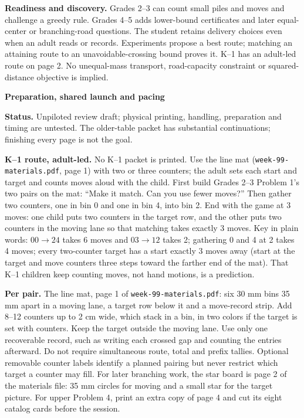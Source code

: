 \documentclass[11pt]{article}
\newcommand{\head}[1]{\par\textbf{\large #1}\par}
\begin{document}
\textbf{Readiness and discovery.} Grades 2--3 can count small piles and moves and challenge a greedy rule. Grades 4--5 adds lower-bound certificates and later equal-center or branching-road questions. The student retains delivery choices even when an adult reads or records. Experiments propose a best route; matching an attaining route to an unavoidable-crossing bound proves it. K--1 has an adult-led route on page 2. No unequal-mass transport, road-capacity constraint or squared-distance objective is implied.
\newpage
\head{Preparation, shared launch and pacing}
\textbf{Status.} Unpiloted review draft; physical printing, handling, preparation and timing are untested. The older-table packet has substantial continuations; finishing every page is not the goal.

\textbf{K--1 route, adult-led.} No K--1 packet is printed. Use the line mat (\texttt{week-99-materials.pdf}, page 1) with two or three counters; the adult sets each start and target and counts moves aloud with the child. First build Grades 2--3 Problem 1's two pairs on the mat: ``Make it match. Can you use fewer moves?'' Then gather two counters, one in bin 0 and one in bin 4, into bin 2. End with the game at 3 moves: one child puts two counters in the target row, and the other puts two counters in the moving lane so that matching takes exactly 3 moves. Key in plain words: $00\to24$ takes 6 moves and $03\to12$ takes 2; gathering 0 and 4 at 2 takes 4 moves; every two-counter target has a start exactly 3 moves away (start at the target and move counters three steps toward the farther end of the mat). That K--1 children keep counting moves, not hand motions, is a prediction.

\textbf{Per pair.} The line mat, page 1 of \texttt{week-99-materials.pdf}: six 30 mm bins 35 mm apart in a moving lane, a target row below it and a move-record strip. Add 8--12 counters up to 2 cm wide, which stack in a bin, in two colors if the target is set with counters. Keep the target outside the moving lane. Use only one recoverable record, such as writing each crossed gap and counting the entries afterward. Do not require simultaneous route, total and prefix tallies. Optional removable counter labels identify a planned pairing but never restrict which target a counter may fill. For later branching work, the star board is page 2 of the materials file: 35 mm circles for moving and a small star for the target picture. For upper Problem 4, print an extra copy of page 4 and cut its eight catalog cards before the session.
\end{document}
